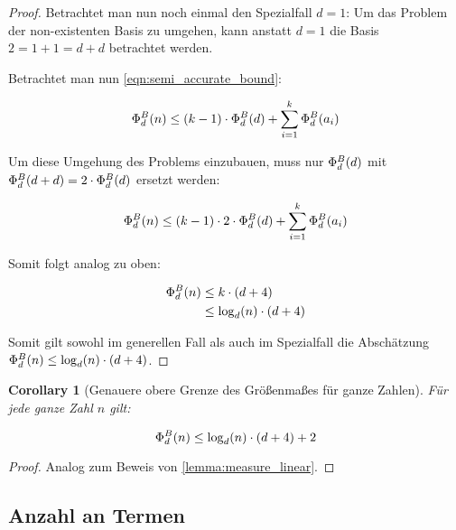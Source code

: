 \documentclass{article}
\newtheorem{corollary}{Corollary}[theorem]
\theoremstyle{nonumberplain}
\newtheorem{proof}{Beweis}
\begin{document}
\begin{proof}
    Betrachtet man nun noch einmal den Spezialfall \(d = 1\):
    Um das Problem der non-existenten Basis zu umgehen, kann anstatt \(d = 1\) die Basis \(2 = 1 + 1 = d + d\) betrachtet werden.
     
    
   Betrachtet man nun \ref{eqn:semi_accurate_bound}:

   \[\Phi_{d}^{B}(n) \leq (k-1) \cdot \Phi_{d}^{B}(d) + \sum_{i=1}^k \Phi_{d}^{B}(a_i)\]

   Um diese Umgehung des Problems einzubauen, muss nur \(\Phi_{d}^{B}(d)\) mit \(\Phi_{d}^{B}(d + d) = 2\cdot\Phi_{d}^{B}(d)\) ersetzt werden:


    \[\Phi_{d}^{B}(n) \leq (k-1) \cdot 2 \cdot \Phi_{d}^{B}(d) + \sum_{i=1}^k \Phi_{d}^{B}(a_i)\]

    Somit folgt analog zu oben:

    \begin{align*}
        \Phi_{d}^{B}(n) 
        &\leq k \cdot (d+4) \\
        &\leq \log_d(n) \cdot (d+4) \\
    \end{align*}


    Somit gilt sowohl im generellen Fall als auch im Spezialfall die Abschätzung \(\Phi_{d}^{B}(n) \leq \log_d(n) \cdot (d+4)\).
\end{proof}

\begin{corollary}[Genauere obere Grenze des Größenmaßes für ganze Zahlen]\label{corollary:phi_bound}
    Für jede ganze Zahl \(n\) gilt:
    
        \[\Phi_{d}^{B}(n) \leq \log_d(n) \cdot (d+4) + 2\]
\end{corollary}
\begin{proof}
    Analog zum Beweis von \ref{lemma:measure_linear}.
\end{proof}

\subsection{Anzahl an Termen}
\end{document}
